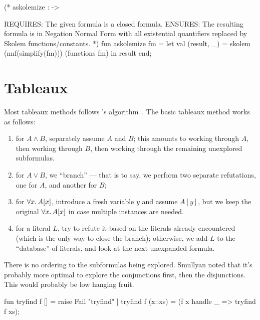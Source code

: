 (* askolemize :  -> 

REQUIRES: The given formula is a closed formula.
ENSURES: The resulting formula is in Negation Normal Form with
         all existential quantifiers replaced by Skolem
         functions/constants. *)
fun askolemize fm =
  let val (result, _) = skolem (nnf(simplify(fm))) (functions fm)
  in result end;
\nwendcode{}\nwdocspar

\section{Tableaux}

\begin{node}
Most tableaux methods follows \leanTAP's algorithm~\cite{beckert1995leantap}.
The basic tableaux method works as follows:
\begin{enumerate}
\item for $A\land B$, separately assume $A$ and $B$; this amounts to
  working through $A$, then working through $B$, then working through
  the remaining unexplored subformulas.
\item for $A\lor B$, we ``branch'' --- that is to say, we perform two
  separate refutations, one for $A$, and another for $B$;
\item for $\forall x\ldotp A[x]$, introduce a fresh variable $y$ and
  assume $A[y]$, but we keep the original $\forall x\ldotp A[x]$
  in case multiple instances are needed.
\item for a literal $L$, try to refute it based on the literals
  already encountered (which is the only way to close the branch);
  otherwise, we add $L$ to the ``database'' of
  literals, and look at the next unexpanded formula.
\end{enumerate}
There is no ordering to the subformulas being explored. Smullyan noted
that it's probably more optimal to explore the conjunctions first,
then the disjunctions. This would probably be low hanging fruit.
\end{node}

\nwenddocs{}\endmoddef\nwstartdeflinemarkup{}\nwenddeflinemarkup
fun tryfind f [] = raise Fail "tryfind"
  | tryfind f (x::xs) = (f x
                         handle _ => tryfind f xs);

